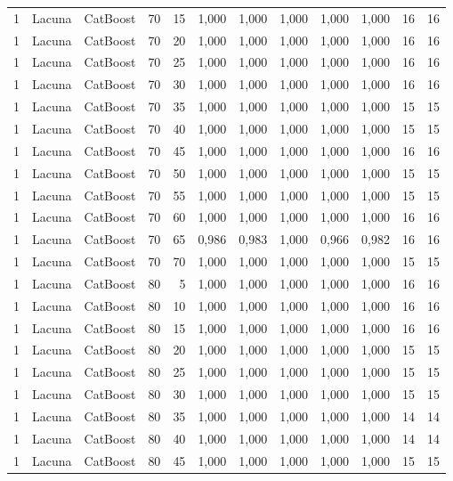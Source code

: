 \begin{longtable}{@{}rllrrrrrrrrr@{}}
1 & Lacuna & CatBoost & 70 & 15 & 1,000 & 1,000 & 1,000 & 1,000 & 1,000 & 16 & 16 \\
1 & Lacuna & CatBoost & 70 & 20 & 1,000 & 1,000 & 1,000 & 1,000 & 1,000 & 16 & 16 \\
1 & Lacuna & CatBoost & 70 & 25 & 1,000 & 1,000 & 1,000 & 1,000 & 1,000 & 16 & 16 \\
1 & Lacuna & CatBoost & 70 & 30 & 1,000 & 1,000 & 1,000 & 1,000 & 1,000 & 16 & 16 \\
1 & Lacuna & CatBoost & 70 & 35 & 1,000 & 1,000 & 1,000 & 1,000 & 1,000 & 15 & 15 \\
1 & Lacuna & CatBoost & 70 & 40 & 1,000 & 1,000 & 1,000 & 1,000 & 1,000 & 15 & 15 \\
1 & Lacuna & CatBoost & 70 & 45 & 1,000 & 1,000 & 1,000 & 1,000 & 1,000 & 16 & 16 \\
1 & Lacuna & CatBoost & 70 & 50 & 1,000 & 1,000 & 1,000 & 1,000 & 1,000 & 15 & 15 \\
1 & Lacuna & CatBoost & 70 & 55 & 1,000 & 1,000 & 1,000 & 1,000 & 1,000 & 15 & 15 \\
1 & Lacuna & CatBoost & 70 & 60 & 1,000 & 1,000 & 1,000 & 1,000 & 1,000 & 16 & 16 \\
1 & Lacuna & CatBoost & 70 & 65 & 0,986 & 0,983 & 1,000 & 0,966 & 0,982 & 16 & 16 \\
1 & Lacuna & CatBoost & 70 & 70 & 1,000 & 1,000 & 1,000 & 1,000 & 1,000 & 15 & 15 \\
1 & Lacuna & CatBoost & 80 & 5 & 1,000 & 1,000 & 1,000 & 1,000 & 1,000 & 16 & 16 \\
1 & Lacuna & CatBoost & 80 & 10 & 1,000 & 1,000 & 1,000 & 1,000 & 1,000 & 16 & 16 \\
1 & Lacuna & CatBoost & 80 & 15 & 1,000 & 1,000 & 1,000 & 1,000 & 1,000 & 16 & 16 \\
1 & Lacuna & CatBoost & 80 & 20 & 1,000 & 1,000 & 1,000 & 1,000 & 1,000 & 15 & 15 \\
1 & Lacuna & CatBoost & 80 & 25 & 1,000 & 1,000 & 1,000 & 1,000 & 1,000 & 15 & 15 \\
1 & Lacuna & CatBoost & 80 & 30 & 1,000 & 1,000 & 1,000 & 1,000 & 1,000 & 15 & 15 \\
1 & Lacuna & CatBoost & 80 & 35 & 1,000 & 1,000 & 1,000 & 1,000 & 1,000 & 14 & 14 \\
1 & Lacuna & CatBoost & 80 & 40 & 1,000 & 1,000 & 1,000 & 1,000 & 1,000 & 14 & 14 \\
1 & Lacuna & CatBoost & 80 & 45 & 1,000 & 1,000 & 1,000 & 1,000 & 1,000 & 15 & 15 \\

\end{longtable}
